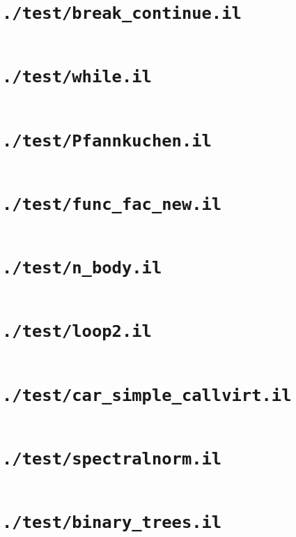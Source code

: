 \documentclass[a4paper, 11pt]{report}
\begin{document}
    \section{\lstinline{./test/break_continue.il}}
    \inputminted{text}{./test/break_continue.il}


    \section{\lstinline{./test/while.il}}
    \inputminted{text}{./test/while.il}


    \section{\lstinline{./test/Pfannkuchen.il}}
    \inputminted{text}{./test/Pfannkuchen.il}


    \section{\lstinline{./test/func_fac_new.il}}
    \inputminted{text}{./test/func_fac_new.il}


    \section{\lstinline{./test/n_body.il}}
    \inputminted{text}{./test/n_body.il}


    \section{\lstinline{./test/loop2.il}}
    \inputminted{text}{./test/loop2.il}


    \section{\lstinline{./test/car_simple_callvirt.il}}
    \inputminted{text}{./test/car_simple_callvirt.il}


    \section{\lstinline{./test/spectralnorm.il}}
    \inputminted{text}{./test/spectralnorm.il}


    \section{\lstinline{./test/binary_trees.il}}
    \inputminted{text}{./test/binary_trees.il}
\end{document}
